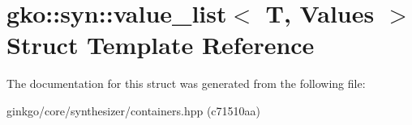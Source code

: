 \hypertarget{structgko_1_1syn_1_1value__list}{}\section{gko\+:\+:syn\+:\+:value\+\_\+list$<$ T, Values $>$ Struct Template Reference}
\label{structgko_1_1syn_1_1value__list}


The documentation for this struct was generated from the following file\+:\begin{DoxyCompactItemize}
\item 
ginkgo/core/synthesizer/containers.\+hpp (c71510aa)\end{DoxyCompactItemize}

